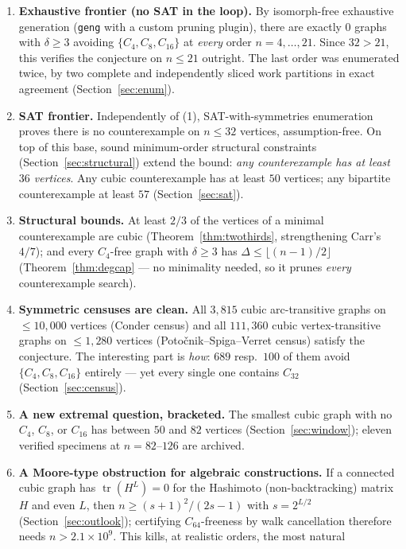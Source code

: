 \documentclass[11pt]{article}
\theoremstyle{remark}
\newcommand{\Cyc}[1]{C_{#1}}
\begin{document}
\begin{enumerate}
\item \textbf{Exhaustive frontier (no SAT in the loop).} By isomorph-free
exhaustive generation (\texttt{geng} with a custom pruning plugin), there are
exactly $0$ graphs with $\delta \ge 3$ avoiding $\{\Cyc4, \Cyc8, \Cyc{16}\}$
at \emph{every} order $n = 4, \dots, 21$. Since $32 > 21$, this verifies the
conjecture on $n \le 21$ outright. The last order was enumerated twice, by
two complete and independently sliced work partitions in exact agreement
(Section~\ref{sec:enum}).
\item \textbf{SAT frontier.} Independently of (1), SAT-with-symmetries
enumeration proves there is no counterexample on $n \le 32$ vertices,
assumption-free. On top of this base, sound minimum-order structural
constraints (Section~\ref{sec:structural}) extend the bound: \emph{any
counterexample has at least $36$ vertices}. Any cubic counterexample has at
least $50$ vertices; any bipartite counterexample at least $57$
(Section~\ref{sec:sat}).
\item \textbf{Structural bounds.} At least $2/3$ of the vertices of a
minimal counterexample are cubic (Theorem~\ref{thm:twothirds}, strengthening
Carr's $4/7$); and every $\Cyc4$-free graph with $\delta\ge3$ has
$\Delta \le \lfloor (n-1)/2\rfloor$ (Theorem~\ref{thm:degcap} --- no
minimality needed, so it prunes \emph{every} counterexample search).
\item \textbf{Symmetric censuses are clean.} All $3{,}815$ cubic
arc-transitive graphs on $\le 10{,}000$ vertices (Conder census) and all
$111{,}360$ cubic vertex-transitive graphs on $\le 1{,}280$ vertices
(Poto\v{c}nik--Spiga--Verret census) satisfy the conjecture. The interesting
part is \emph{how}: $689$ resp.\ $100$ of them avoid
$\{\Cyc4,\Cyc8,\Cyc{16}\}$ entirely --- yet every single one contains
$\Cyc{32}$ (Section~\ref{sec:census}).
\item \textbf{A new extremal question, bracketed.} The smallest cubic graph
with no $\Cyc4$, $\Cyc8$, or $\Cyc{16}$ has between $50$ and $82$ vertices
(Section~\ref{sec:window}); eleven verified specimens at $n = 82$--$126$ are
archived.
\item \textbf{A Moore-type obstruction for algebraic constructions.} If a
connected cubic graph has $\operatorname{tr}(H^L) = 0$ for the Hashimoto
(non-backtracking) matrix $H$ and even $L$, then
$n \ge (s+1)^2/(2s-1)$ with $s = 2^{L/2}$ (Section~\ref{sec:outlook});
certifying $\Cyc{64}$-freeness by walk cancellation therefore needs
$n > 2.1\times 10^9$. This kills, at realistic orders, the most natural

\end{enumerate}
\end{document}
